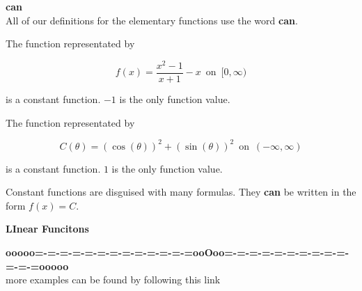 \documentclass{ximera}
\begin{document}
\begin{warning}   \textbf{\textcolor{red!80!black}{can}}  \\

All of our definitions for the elementary functions use the word \textbf{\textcolor{red!80!black}{can}}.


\begin{example}

The function representated by 

\[ f(x) = \frac{x^2 - 1}{x + 1} - x  \,  \text{ on } \,   [0, \infty)   \]

is a constant function.   $-1$ is the only function value.


\end{example}





\begin{example}

The function representated by 

\[ C(\theta) = (\cos(\theta))^2 + (\sin(\theta))^2   \,  \text{ on } \,   (-\infty, \infty)   \]

is a constant function.   $1$ is the only function value.


\end{example}




Constant functions are disguised with many formulas.  They \textbf{\textcolor{red!80!black}{can}} be written in the form $f(x) = C$.



\end{warning}














\begin{template}  \textbf{\textcolor{blue!55!black}{LInear Funcitons}} \\
\end{template}







\begin{center}
\textbf{\textcolor{green!50!black}{ooooo=-=-=-=-=-=-=-=-=-=-=-=-=ooOoo=-=-=-=-=-=-=-=-=-=-=-=-=ooooo}} \\

more examples can be found by following this link\\ 

\end{center}
\end{document}
